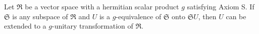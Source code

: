 Let $\mathfrak{R}$ be a vector space with a hermitian scalar product $g$ satisfying Axiom S. If $\mathfrak{S}$ is any subspace of $\mathfrak{R}$ and $U$ is a $g$-equivalence of $\mathfrak{S}$ onto $\mathfrak{S}U$, then $U$ can be extended to a $g$-unitary transformation of $\mathfrak{R}$.
